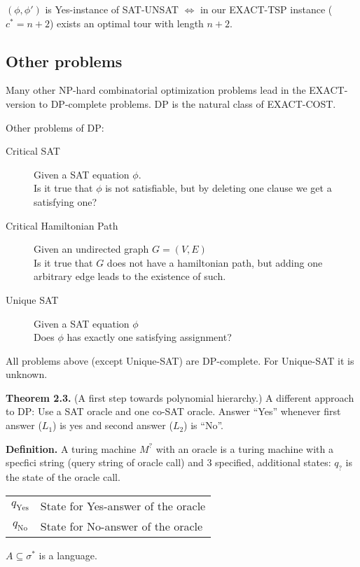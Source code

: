 \documentclass[a4paper]{article}
\newcommand{\cls}[1]{\rm{#1}}
\begin{document}
$(\phi, \phi')$ is Yes-instance of SAT-UNSAT $\Leftrightarrow$
in our EXACT-TSP instance ($c^* = n+2$) exists an optimal tour with
length $n+2$.

\subsection{Other problems}

Many other \cls{NP}-hard combinatorial optimization problems lead
in the EXACT-version to \cls{DP}-complete problems.
\cls{DP} is the natural class of EXACT-COST.

Other problems of \cls{DP}:
\begin{description}
  \item[Critical SAT]
    Given a SAT equation $\phi$. \\
    Is it true that $\phi$ is not satisfiable, but by deleting one clause
    we get a satisfying one?
  \item[Critical Hamiltonian Path]
    Given an undirected graph $G = (V, E)$ \\
    Is it true that $G$ does not have a hamiltonian path,
    but adding one arbitrary edge leads to the existence of such.
  \item[Unique SAT]
    Given a SAT equation $\phi$ \\
    Does $\phi$ has exactly one satisfying assignment?
\end{description}

All problems above (except Unique-SAT) are \cls{DP}-complete. For Unique-SAT
it is unknown.

\textbf{Theorem 2.3.} (A first step towards polynomial hierarchy.)
A different approach to \cls{DP}: Use a SAT oracle and one co-SAT oracle.
Answer ``Yes'' whenever first answer ($L_1$) is yes and second answer
($L_2$) is ``No''.

\textbf{Definition.} A turing machine $M^?$ with an oracle is a turing
machine with a specfici string (query string of oracle call) and 3
specified, additional states: $q_?$ is the state of the oracle call.

\begin{center}
  \begin{tabular}{cl}
    $q_{\text{Yes}}$ & State for Yes-answer of the oracle \\
    $q_{\text{No}}$  & State for No-answer of the oracle
  \end{tabular}
\end{center}

$A \subseteq \sigma^*$ is a language.
\end{document}
